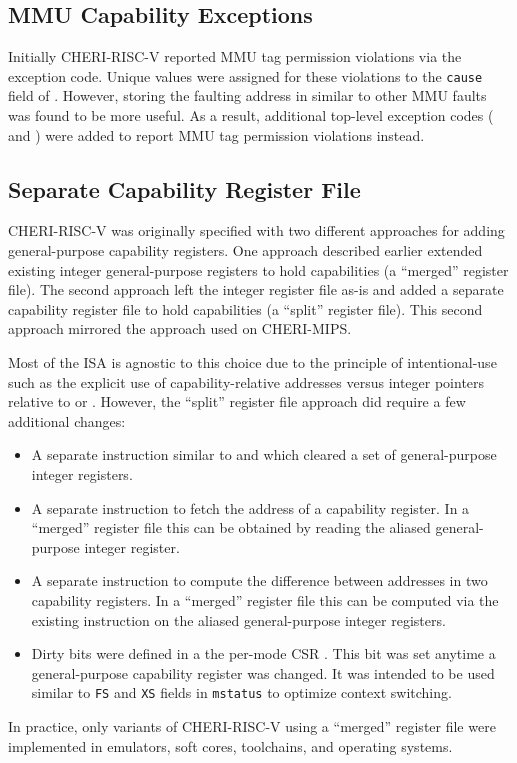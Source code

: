 \subsection{MMU Capability Exceptions}

Initially CHERI-RISC-V reported MMU tag permission violations via the
\riscvcheriexception{} exception code.  Unique values were assigned
for these violations to the \texttt{cause} field of \xtval{}.
However, storing the faulting address in \xtval{} similar to other MMU
faults was found to be more useful.  As a result, additional top-level
exception codes (\riscvloadcappagefault{} and
\riscvstorecappagefault{}) were added to report MMU tag permission
violations instead.

\subsection{Separate Capability Register File}

CHERI-RISC-V was originally specified with two different approaches
for adding general-purpose capability registers.  One approach
described earlier extended existing integer general-purpose registers
to hold capabilities (a ``merged'' register file).  The second
approach left the integer register file as-is and added a separate
capability register file to hold capabilities (a ``split'' register
file).  This second approach mirrored the approach used on CHERI-MIPS.

Most of the ISA is agnostic to this choice due to the principle of
intentional-use such as the explicit use of capability-relative
addresses versus integer pointers relative to \DDC{} or \PCC{}.
However, the ``split'' register file approach did require a few
additional changes:

\begin{itemize}
\item A separate  instruction similar to
   and  which cleared a set
  of general-purpose integer registers.

\item A separate  instruction to fetch the address
  of a capability register.  In a ``merged'' register file this can be
  obtained by reading the aliased general-purpose integer register.

\item A separate  instruction to compute the difference
  between addresses in two capability registers.  In a ``merged''
  register file this can be computed via the existing 
  instruction on the aliased general-purpose integer registers.

\item Dirty bits were defined in a the per-mode CSR \xccsr{}. This bit
  was set anytime a general-purpose capability register was changed.
  It was intended to be used similar to \texttt{FS} and \texttt{XS}
  fields in \texttt{mstatus} to optimize context switching.
\end{itemize}

In practice, only variants of CHERI-RISC-V using a ``merged'' register
file were implemented in emulators, soft cores, toolchains, and
operating systems.
